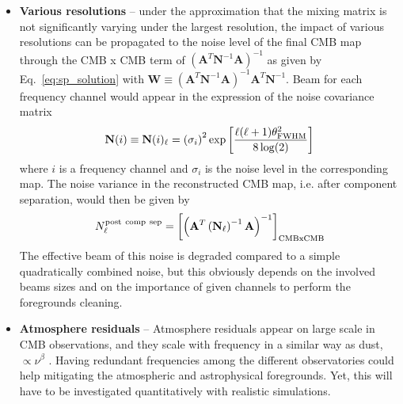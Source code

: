 \begin{itemize}
	\item \textbf{Various resolutions} -- under the approximation that the mixing matrix is not significantly varying under the largest resolution, the impact of various resolutions can be propagated to the noise level of the final CMB map through the CMB x CMB term of $\left(\mathbf{A}^T\mathbf{N}^{-1}\mathbf{A}\right)^{-1}$ as given by Eq.~\ref{eq:sp_solution} with $\mathbf{W} \equiv \left( \mathbf{A}^T\mathbf{N}^{-1}\mathbf{A} \right)^{-1}\mathbf{A}^T\mathbf{N}^{-1}$. Beam for each frequency channel would appear in the expression of the noise covariance matrix 
	\begin{eqnarray}
		\centering
			\mathbf{N}(i) \equiv \mathbf{N}(i)_\ell = \left( \sigma_i\right)^2\exp\left[ \frac{\ell(\ell+1)\theta_{\rm FWHM}^2}{8\log(2)} \right]
	\end{eqnarray}
	where $i$ is a frequency channel and $\sigma_i$ is the noise level in the corresponding map. The noise variance in the reconstructed CMB map, i.e. after component separation, would then be given by
	\begin{eqnarray}
		\centering
			N_\ell^{\rm post\ comp\ sep} = \left[\left(\mathbf{A}^T\left(\mathbf{N}_\ell\right)^{-1}\mathbf{A}\right)^{-1}\right]_{\rm CMBxCMB}
	\end{eqnarray}
	The effective beam of this noise is degraded compared to a simple quadratically combined noise, but this obviously depends on the involved beams sizes and on the importance of given channels to perform the foregrounds cleaning.
	\item \textbf{Atmosphere residuals} -- Atmosphere residuals appear on large scale in CMB observations, and they scale with frequency in a similar way as dust, $\propto \nu^\beta$ \cite{errard15a}. Having redundant frequencies among the different observatories could help mitigating the atmospheric and astrophysical foregrounds. Yet, this will have to be investigated quantitatively with realistic simulations.
\end{itemize}




%

